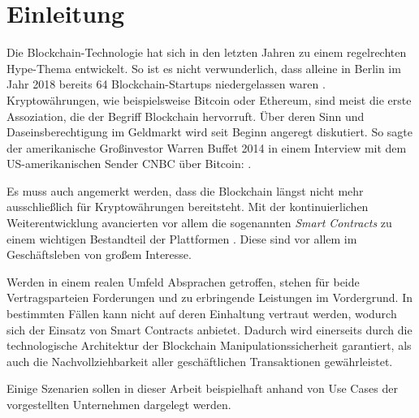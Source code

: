 \chapter{Einleitung}
\label{chap:Einleitung}
Die Blockchain-Technologie hat sich in den letzten Jahren zu einem regelrechten Hype-Thema entwickelt. So ist es nicht verwunderlich, dass alleine in Berlin im Jahr 2018 bereits 64 Blockchain-Startups niedergelassen waren \cite{AnzahlStartups2018}. Kryptowährungen, wie beispielsweise Bitcoin oder Ethereum, sind meist die erste Assoziation, die der Begriff Blockchain hervorruft. Über deren Sinn und Daseinsberechtigung im Geldmarkt wird seit Beginn angeregt diskutiert. So sagte der amerikanische Großinvestor Warren Buffet 2014 in einem Interview mit dem US-amerikanischen Sender CNBC über Bitcoin:  \cite{Buffett2014}.

Es muss auch angemerkt werden, dass die Blockchain längst nicht mehr ausschließlich für Kryptowährungen bereitsteht. Mit der kontinuierlichen Weiterentwicklung avancierten vor allem die sogenannten \textit{Smart Contracts} zu einem wichtigen Bestandteil der Plattformen \cite[vgl.][S.~8]{Schuette2017}. Diese sind vor allem im Geschäftsleben von großem Interesse.

Werden in einem realen Umfeld Absprachen getroffen, stehen für beide Vertragsparteien Forderungen und zu erbringende Leistungen im Vordergrund. In bestimmten Fällen kann nicht auf deren Einhaltung vertraut werden, wodurch sich der Einsatz von Smart Contracts anbietet. Dadurch wird einerseits durch die technologische Architektur der Blockchain Manipulationssicherheit garantiert, als auch die Nachvollziehbarkeit aller geschäftlichen Transaktionen gewährleistet.

Einige Szenarien sollen in dieser Arbeit beispielhaft anhand von Use Cases der vorgestellten Unternehmen dargelegt werden. 